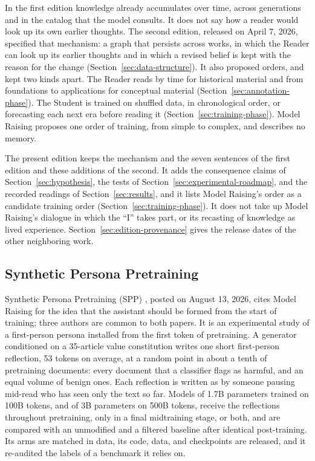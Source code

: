 \documentclass[11pt]{article}
\begin{document}
In the first edition knowledge already accumulates over time, across
generations and in the catalog that the model consults. It does not say how a
reader would look up its own earlier thoughts. The second edition, released on
April 7, 2026, specified that mechanism: a graph that persists across works, in
which the Reader can look up its earlier thoughts and in which a revised belief
is kept with the reason for the change (Section~\ref{sec:data-structure}). It
also proposed orders, and kept two kinds apart. The Reader reads by time for
historical material and from foundations to applications for conceptual
material (Section~\ref{sec:annotation-phase}). The Student is trained on
shuffled data, in chronological order, or forecasting each next era before
reading it (Section~\ref{sec:training-phase}). Model Raising proposes one order
of training, from simple to complex, and describes no memory.

The present edition keeps the mechanism and the seven sentences of the first
edition and these additions of the second. It adds the consequence claims of
Section~\ref{sec:hypothesis}, the tests of
Section~\ref{sec:experimental-roadmap}, and the recorded readings of
Section~\ref{sec:results}, and it lists Model Raising's order as a candidate
training order (Section~\ref{sec:training-phase}). It does not take up Model Raising's
dialogue in which the \enquote{I} takes part, or its recasting of knowledge as
lived experience. Section~\ref{sec:edition-provenance} gives the release dates of
the other neighboring work.

\subsection{Synthetic Persona Pretraining}\label{sec:spp}

Synthetic Persona Pretraining (SPP) \cite{minder2026spp}, posted on August 13,
2026, cites Model Raising for the idea that the assistant should be formed
from the start of training; three authors are common to both papers. It is an
experimental
study of a first-person persona installed from the first token of pretraining.
A generator conditioned on a 35-article value constitution writes one short
first-person reflection, 53 tokens on average, at a random point in about a
tenth of pretraining documents: every document that a classifier flags as
harmful, and an equal volume of benign ones. Each reflection is written as by
someone pausing mid-read who has seen only the text so far. Models of 1.7B
parameters trained on 100B tokens, and of 3B parameters on 500B tokens, receive
the reflections throughout pretraining, only in a final midtraining stage, or
both, and are compared with an unmodified and a filtered baseline after
identical post-training. Its arms are matched in data, its code, data, and
checkpoints are released, and it re-audited the labels of a benchmark it
relies on.
\end{document}
